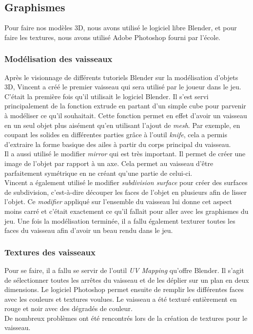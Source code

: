 \documentclass[12pt, titlepage]{article}
\begin{document}
\begin{spacing}{1.5}
\subsection{Graphismes}

Pour faire nos modèles 3D, nous avons utilisé le logiciel libre Blender, et pour faire les textures, nous avons utilisé Adobe Photoshop fourni par l'école.\\

\subsubsection{Modélisation des vaisseaux}

Après le visionnage de différents tutoriels Blender sur la modélisation d'objets 3D, Vincent a créé le premier vaisseau qui sera utilisé par le joueur dans le jeu. C'était la première fois qu'il utilisait le logiciel Blender. Il s'est servi principalement de la fonction extrude en partant d'un simple cube pour parvenir à modéliser ce qu'il souhaitait. Cette fonction permet en effet d'avoir un vaisseau en un seul objet plus aisément qu'en utilisant l'ajout de \textit{mesh}. Par exemple, en coupant les solides en différentes parties grâce à l'outil \textit{knife}, cela a permis d'extraire la forme basique des ailes à partir du corps principal du vaisseau.\\

Il a aussi utilisé le modifier \textit{mirror} qui est très important. Il permet de créer une image de l’objet par rapport à un axe. Cela permet au vaisseau d'être parfaitement symétrique en ne créant qu’une partie de celui-ci.\\

Vincent a également utilisé le modifier \textit{subdivision surface} pour créer des surfaces de subdivision, c’est-à-dire découper les faces de l’objet en plusieurs afin de lisser l’objet. Ce \textit{modifier} appliqué sur l’ensemble du vaisseau lui donne cet aspect moins carré et c’était exactement ce qu’il fallait pour aller avec les graphismes du jeu. Une fois la modélisation terminée, il a fallu également texturer toutes les faces du vaisseau afin d'avoir un beau rendu dans le jeu.\\

\subsubsection{Textures des vaisseaux}

Pour se faire, il a fallu se servir de l'outil \textit{UV Mapping} qu'offre Blender. Il s'agit de sélectionner toutes les arrêtes du vaisseau et de les déplier sur un plan en deux dimensions. Le logiciel Photoshop permet ensuite de remplir les différentes faces avec les couleurs et textures voulues. Le vaisseau a été texturé entièrement en rouge et noir avec des dégradés de couleur.\\
De nombreux problèmes ont été rencontrés lors de la création de textures pour le vaisseau.\\


\end{spacing}
\end{document}
